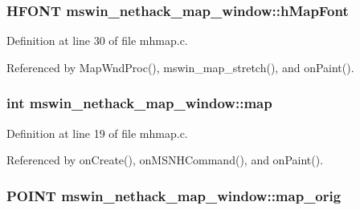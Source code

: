 \hypertarget{structmswin__nethack__map__window_a80fbf3a4db2d22dca0c765a19c54ebc8}{
\subsubsection[{h\+Map\+Font}]{\setlength{\rightskip}{0pt plus 5cm}H\+F\+O\+N\+T mswin\+\_\+nethack\+\_\+map\+\_\+window\+::h\+Map\+Font}}\label{structmswin__nethack__map__window_a80fbf3a4db2d22dca0c765a19c54ebc8}


Definition at line 30 of file mhmap.\+c.



Referenced by Map\+Wnd\+Proc(), mswin\+\_\+map\+\_\+stretch(), and on\+Paint().

\hypertarget{structmswin__nethack__map__window_acca7d1798acceef6832742bd7c54083c}{
\subsubsection[{map}]{\setlength{\rightskip}{0pt plus 5cm}int mswin\+\_\+nethack\+\_\+map\+\_\+window\+::map}}\label{structmswin__nethack__map__window_acca7d1798acceef6832742bd7c54083c}


Definition at line 19 of file mhmap.\+c.



Referenced by on\+Create(), on\+M\+S\+N\+H\+Command(), and on\+Paint().

\hypertarget{structmswin__nethack__map__window_afc6012fbec67e292e844780d1d672aa4}{
\subsubsection[{map\+\_\+orig}]{\setlength{\rightskip}{0pt plus 5cm}P\+O\+I\+N\+T mswin\+\_\+nethack\+\_\+map\+\_\+window\+::map\+\_\+orig}}\label{structmswin__nethack__map__window_afc6012fbec67e292e844780d1d672aa4}



